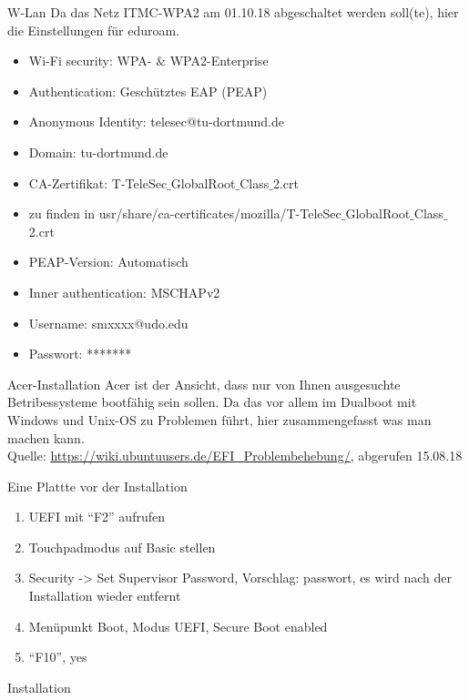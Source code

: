 \begin{frame}{W-Lan}
    Da das Netz ITMC-WPA2 am 01.10.18 abgeschaltet werden soll(te), hier die Einstellungen für eduroam.
    \begin{itemize}
        \item Wi-Fi security: WPA- $\&$ WPA2-Enterprise
        \item Authentication: Geschütztes EAP (PEAP)
        \item Anonymous Identity: telesec@tu-dortmund.de
        \item Domain: tu-dortmund.de
        \item CA-Zertifikat: T-TeleSec$\_$GlobalRoot$\_$Class$\_$2.crt
        \item zu finden in usr/share/ca-certificates/mozilla/T-TeleSec$\_$GlobalRoot$\_$Class$\_$2.crt
        \item PEAP-Version: Automatisch
        \item Inner authentication: MSCHAPv2
        \item Username: smxxxx@udo.edu
        \item Passwort: *******
    \end{itemize}
\end{frame}

\begin{frame}{Acer-Installation}
    Acer ist der Ansicht, dass nur von Ihnen ausgesuchte Betribessysteme bootfähig sein sollen.
    Da das vor allem im Dualboot mit Windows und Unix-OS zu Problemen führt, hier zusammengefasst was man machen kann.\\
    Quelle: \url{https://wiki.ubuntuusers.de/EFI_Problembehebung/}, abgerufen 15.08.18

\end{frame}

\begin{frame}{Eine Plattte}
    vor der Installation
    \begin{enumerate}
        \item UEFI mit \enquote{F2} aufrufen
        \item Touchpadmodus auf Basic stellen
        \item Security -> Set Supervisor Password, Vorschlag: passwort, es wird nach der Installation wieder entfernt
        \item Menüpunkt Boot, Modus UEFI, Secure Boot enabled
        \item \enquote{F10}, yes
    \end{enumerate}
    Installation
\end{frame}

